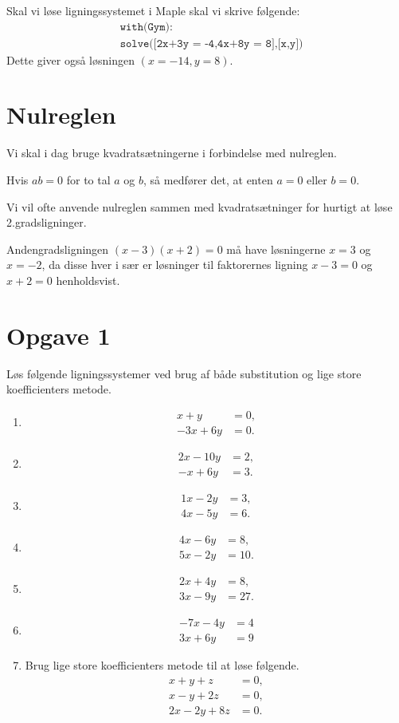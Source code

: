 \begin{exa}
	Skal vi løse ligningssystemet i Maple skal vi skrive følgende:
	\begin{align*}
		&\texttt{with(Gym):}\\
		&\texttt{solve([2x+3y = -4,4x+8y = 8],[x,y])}
	\end{align*}
	Dette giver også løsningen $(x = -14, y = 8)$.
\end{exa}
\section*{Nulreglen}
Vi skal i dag bruge kvadratsætningerne i forbindelse med nulreglen. 
\begin{setn}[Nulreglen]
Hvis $ab = 0$ for to tal $a$ og $b$, så medfører det, at enten $a=0$ eller $b=0$. 
\end{setn}
Vi vil ofte anvende nulreglen sammen med kvadratsætninger for hurtigt at løse 2.gradsligninger. 
\begin{exa}
	Andengradsligningen $(x-3)(x+2) = 0$ må have løsningerne $x = 3$ og $x = -2$, da disse hver
	i sær er løsninger til faktorernes ligning $x-3 = 0$ og $x+2 = 0$ henholdsvist.  
\end{exa}
\section*{Opgave 1}
Løs følgende ligningssystemer ved brug af både substitution og lige store koefficienters metode.
\begin{enumerate}[label=\roman*)]
\item \begin{align*}
x+y&=0,\\
-3x+6y&=0.
\end{align*}
\item 
\begin{align*}
2x-10y&=2,\\
-x+6y&=3.
\end{align*}
\item
\begin{align*}
1x-2y&=3,\\
4x-5y&=6.
\end{align*}
\item
\begin{align*}
4x-6y&=8,\\
5x-2y&=10.
\end{align*}
\item 
\begin{align*}
2x+4y&=8,\\
3x-9y&=27.
\end{align*}
\item 
\begin{align*}
	-7x -4y &= 4 \\
	3x + 6y &= 9
\end{align*}

\item Brug lige store koefficienters metode til at løse følgende.
\begin{align*}
x+y+z&=0,\\
x-y+2z&=0,\\
2x-2y+8z&=0.
\end{align*}
\end{enumerate}
